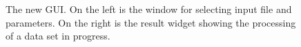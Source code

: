 \begin{figure}
\hfill
{}
	\caption{The new GUI. On the left is the window for selecting input file and parameters. On the right is the result widget showing the processing of a data set in progress.}
	\label{guiWidgets}	
\end{figure}

